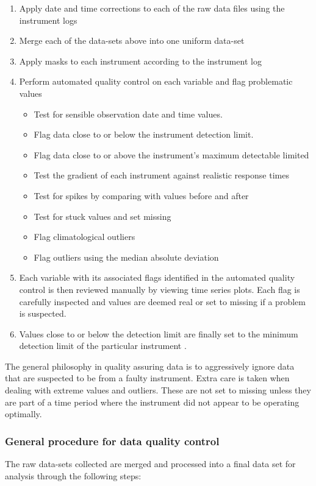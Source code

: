 \documentclass{nwureport}
\begin{document}
\begin{enumerate}
\item Apply date and time corrections to each of the raw data files
  using the instrument logs
\item Merge each of the data-sets above into one uniform data-set
\item Apply masks to each instrument according to the instrument log
\item Perform automated quality control on each variable and flag problematic values
  \begin{itemize}
   \item Test for sensible observation date and time values.
   \item Flag data close to or below the instrument detection limit. 
   \item Flag data close to or above the instrument's maximum detectable limited
   \item Test the gradient of each instrument against realistic response times
   \item Test for spikes by comparing with values before and after
   \item Test for stuck values and set missing
   \item Flag climatological outliers
   \item Flag outliers using the median absolute deviation
  \end{itemize}
\item Each variable with its associated flags identified in the automated quality control is then reviewed manually by viewing time series plots. Each flag is carefully inspected and values are deemed real or set to missing if a problem is suspected.
\item Values close to or below the detection limit are finally set to the minimum detection limit of the particular instrument \citep{Croghan2003}.
\end{enumerate}

The general philosophy in quality assuring data is to aggressively
ignore data that are suspected to be from a faulty instrument. Extra
care is taken when dealing with extreme values and outliers. These are
not set to missing unless they are part of a time period where the
instrument did not appear to be operating optimally.

\subsubsection{General procedure for data quality control}
The raw data-sets collected are merged and processed into a final data
set for analysis through the following steps:
\end{document}
